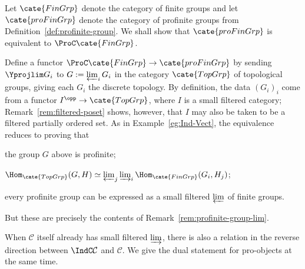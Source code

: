 \begin{example}\label{eg:profinite-group}
	Let $\cate{FinGrp}$ denote the category of finite groups and let $\cate{proFinGrp}$ denote the category of profinite groups from Definition~\ref{def:profinite-group}. We shall show that $\cate{proFinGrp}$ is equivalent to $\ProC\cate{FinGrp}$.

	Define a functor $\ProC\cate{FinGrp}\to\cate{proFinGrp}$ by sending $\Yprojlim G_i$ to $G:=\varprojlim_iG_i$ in the category $\cate{TopGrp}$ of topological groups, giving each $G_i$ the discrete topology. By definition, the data $(G_i)_i$ come from a functor $I^{\opp}\to\cate{TopGrp}$, where $I$ is a small filtered category; Remark~\ref{rem:filtered-poset} shows, however, that $I$ may also be taken to be a filtered partially ordered set. As in Example~\ref{eg:Ind-Vect}, the equivalence reduces to proving that
	\begin{compactitem}
		\item the group $G$ above is profinite;
		\item $\Hom_{\cate{TopGrp}}(G,H)\simeq\varprojlim_j\varinjlim_i\Hom_{\cate{FinGrp}}(G_i,H_j)$;
		\item every profinite group can be expressed as a small filtered $\varprojlim$ of finite groups.
	\end{compactitem}
	But these are precisely the contents of Remark~\ref{rem:profinite-group-lim}.
\end{example}

When $\mathcal{C}$ itself already has small filtered $\varinjlim$, there is also a relation in the reverse direction between $\IndC\mathcal{C}$ and $\mathcal{C}$. We give the dual statement for pro-objects at the same time.

